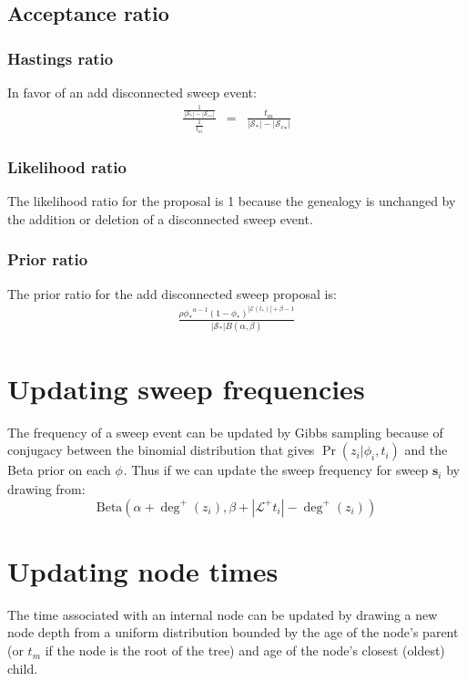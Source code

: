 \documentclass[letterpaper]{article}
\newcommand{\sweep}[1]{{\ensuremath{\mathbf{s}_{#1}}}}
\newcommand{\sweeptime}[1]{{\ensuremath{t_{#1}}}}
\newcommand{\sweepfreq}[1]{{\ensuremath{\phi_{#1}}}}
\newcommand{\sweeploc}[1]{{\ensuremath{z_{#1}}}}
\newcommand{\ratesweep}{{\ensuremath{\rho}}}
\newcommand{\sweepalpha}{{\ensuremath{\alpha}}}
\newcommand{\sweepbeta}{{\ensuremath{\beta}}}
\newcommand{\edgesAt}{{\ensuremath{\mathcal{E}}}}
\newcommand{\lineagesAfter}{{\ensuremath{\mathcal{L}^{+}}}}
\newcommand{\entireSweepSet}{{\ensuremath{\mathcal{S}}}}
\newcommand{\connectedSweepSet}{{\ensuremath{\mathcal{S}_c}}}
\newcommand{\outdegree}[1]{{\ensuremath{\deg^{+}\left(#1\right)}}}
\begin{document}
\subsection{Acceptance ratio}
\subsubsection{Hastings ratio}
In favor of an add disconnected sweep event:
\begin{eqnarray}
 	\frac{\frac{1}{|\entireSweepSet_{*}| - |\connectedSweepSet_{*}|}}{\frac{1}{t_m}} & = & \frac{t_m}{|\entireSweepSet_{*}| - |\connectedSweepSet_{*}|}
\end{eqnarray}

\subsubsection{Likelihood ratio}
The likelihood ratio for the proposal is 1 because the  genealogy is unchanged by the addition or deletion of a disconnected sweep event.

\subsubsection{Prior ratio}
The prior ratio for the add disconnected sweep proposal is:
\begin{eqnarray}
	\frac{\ratesweep  \sweepfreq{*}^{\sweepalpha-1}\left(1-\sweepfreq{*}\right)^{|\edgesAt(\sweeptime{*})| + \sweepbeta-1}}{|\entireSweepSet_{*}|B(\sweepalpha, \sweepbeta)}
\end{eqnarray}

\section{Updating sweep frequencies}
The frequency of a sweep event can be updated by Gibbs sampling because of conjugacy between the binomial distribution that gives $\Pr\left(\sweeploc{i}|\sweepfreq{i},\sweeptime{i}\right) $ and the Beta prior on each $\sweepfreq{}$.
Thus if we can update the sweep frequency for sweep $\sweep{i}$ by drawing from:
\[ \mbox{Beta}\left(\sweepalpha + \outdegree{\sweeploc{i}}, \sweepbeta + |\lineagesAfter{\sweeptime{i}}| - \outdegree{\sweeploc{i}}\right) \]

\section{Updating node times}
The time associated with an internal node can be updated by drawing a new node depth from a uniform distribution bounded by the age of the node's parent (or $t_m$ if the node is the root of the tree) and age of the node's closest (oldest) child.
\end{document}
